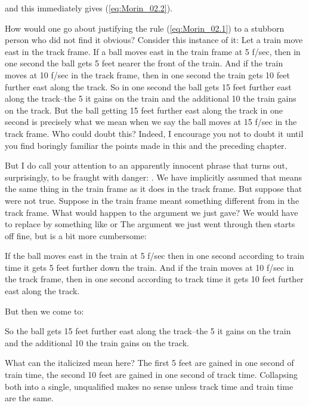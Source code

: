 and this immediately gives (\ref{eq:Morin_02.2}).

How would one go about justifying the rule (\ref{eq:Morin_02.1}) to a stubborn person who did not find it obvious? Consider this instance of it: Let a train move east in the track frame. If a ball moves east in the train frame at 5 f/sec, then in one second the ball gets 5 feet nearer the front of the train. And if the train moves at 10 f/sec in the track frame, then in one second the train gets 10 feet further east along the track. So in one second the ball gets 15 feet further east along the track--the 5 it gains on the train and the additional 10 the train gains on the track. But the ball getting 15 feet further east along the track in one second is precisely what we mean when we say the ball moves at 15 f/sec in the track frame. Who could doubt this? Indeed, I encourage you not to doubt it until you find boringly familiar the points made in this and the preceding chapter. 

But I do call your attention to an apparently innocent phrase that turns out, surprisingly, to be fraught with danger: . We have implicitly assumed that 
means the same thing in the train frame as it does in the track frame. But suppose that were not true. Suppose  in the train frame meant something different from  in the track frame. What would happen to the argument we just gave? We would have to replace  by something like  or  The argument we just went through then starts off fine, but is a bit more cumbersome:

\hangindent=0.7cm If the ball moves east in the train at 5 f/sec then in one second according to train time it gets 5 feet further down the train. And if the train moves at 10 f/sec in the track frame, then in one second according to track time it gets 10 feet further east along the track.

\noindent But then we come to: 

\hangindent=0.7cm So  the ball gets 15 feet further east along the track--the 5 it gains on the train and the additional 10 the train gains on the track.

\noindent What can the italicized  mean here? The first 5 feet are gained in one second of train time, the second 10 feet are gained in one second of track time. Collapsing both into a single, unqualified  makes no sense unless track time and train time are the same. 

